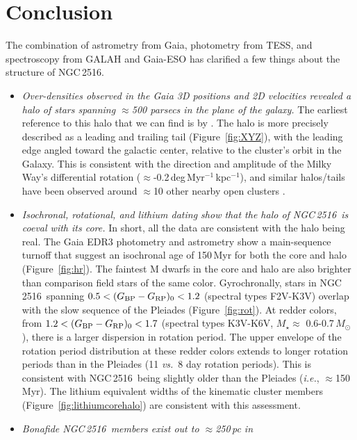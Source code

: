 \documentclass[12pt,twocolumn,tighten]{aastex63}
\newcommand{\cn}{NGC\,2516} %
\newcommand{\bpmrpo}{(G_{\rm BP}-G_{\rm RP})_0}
\begin{document}
\section{Conclusion}
\label{sec:conclusion}

The combination of astrometry from Gaia, photometry from TESS, and
spectroscopy from GALAH and Gaia-ESO has clarified a few things about
the structure of \cn.
\begin{itemize}
  \item {\it Over-densities observed in the Gaia 3D positions and 2D
    velocities revealed a halo of stars spanning $\approx$500 parsecs
    in the plane of the galaxy.} The earliest reference to this halo
    that we can find is by \citet{kounkel_untangling_2019}.  The halo
    is more precisely described as a leading and trailing tail
    (Figure~\ref{fig:XYZ}), with the leading edge angled toward the
    galactic center, relative to the cluster's orbit in the Galaxy.
    This is consistent with the direction and amplitude of the Milky
    Way's differential rotation
    ($\approx$-0.2\,deg\,Myr$^{-1}$\,kpc$^{-1}$), and similar
    halos/tails have been observed around $\approx$10 other nearby
    open clusters \citep{meingast_2021}.
  \item {\it Isochronal, rotational, and lithium dating show that the
    halo of \cn\ is coeval with its core.} In short, all the data are
    consistent with the halo being real.  The Gaia EDR3 photometry and
    astrometry show a main-sequence turnoff that suggest an isochronal
    age of 150\,Myr for both the core and halo (Figure~\ref{fig:hr}).
    The faintest M dwarfs in the core and halo are also brighter than
    comparison field stars of the same color.  Gyrochronally, stars in
    \cn\ spanning $0.5<\bpmrpo<1.2$ (spectral types F2V-K3V) overlap
    with the slow sequence of the Pleiades (Figure~\ref{fig:rot}).  At
    redder colors, from $1.2<\bpmrpo<1.7$ (spectral types K3V-K6V,
    $M_\star$$\approx$ 0.6-0.7\,$M_\odot$), there is a larger
    dispersion in rotation period.  The upper envelope of the rotation
    period distribution at these redder colors extends to longer
    rotation periods than in the Pleiades (11 {\it vs.}\ 8 day
    rotation periods).  This is consistent with \cn\ being slightly
    older than the Pleiades ({\it i.e.}, $\approx$150\,Myr).  The
    lithium equivalent widths of the kinematic cluster members
    (Figure~\ref{fig:lithiumcorehalo}) are consistent with this
    assessment.
  \item {\it Bonafide \cn\ members exist out to $\approx$250\,pc in
}$$
\end{itemize}
\end{document}
